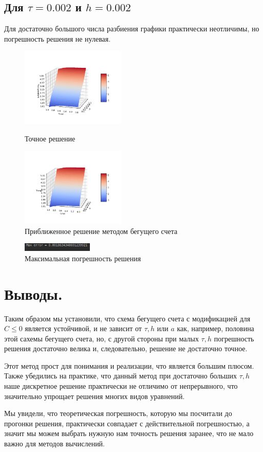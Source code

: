\documentclass[12pt,a4paper]{scrartcl}
\begin{document}
	\subsection{Для $\tau = 0.002$ и $h = 0.002$}
	Для достаточно большого числа разбиения графики практически неотличимы, но погрешность решения не нулевая.
	\begin{figure}[h]
		\begin{multicols}{2}
			\hfill
			\includegraphics[width=50mm]{mainFunc500-500.png}
			\hfill
			\caption{Точное решение}
			\hfill
			\includegraphics[width=50mm]{result500-500.png}
			\hfill
			\caption{Приближенное решение методом бегущего счета}
		\end{multicols}
	\end{figure}
	\begin{figure}[h]
		\centering
		\includegraphics[width=0.3\textwidth]{MaxError500-500.png}
		\caption{Максимальная погрешность решения}
	\end{figure}
	\newpage
	\section{Выводы.}
	Таким образом мы установили, что схема бегущего счета с модификацией для $C \le 0$ является устойчивой, и не зависит от $\tau,h$ или $a$ как, например, половина этой сахемы бегущего счета, но, с другой стороны при малых $\tau, h$ погрешность решения достаточно велика и, следовательно, решение не достаточно точное.
	
	Этот метод прост для понимания и реализации, что является большим плюсом. Также убедились на практике, что данный метод при достаточно больших $\tau, h$ наше дискретное решение практически не отличимо от непрерывного, что значительно упрощает решения многих видов уравнений.
	
	Мы увидели, что теоретическая погрешность, которую мы посчитали до прогонки решения, практически совпадает с действительной погрешностью, а значит мы можем выбрать нужную нам точность решения заранее, что не мало важно для методов вычислений.
\end{document}
